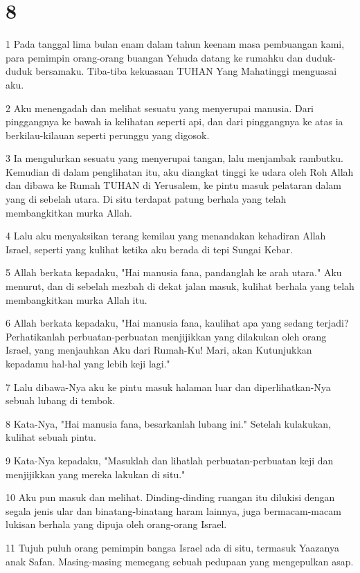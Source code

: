 \chapter{8}

\par 1 Pada tanggal lima bulan enam dalam tahun keenam masa pembuangan kami, para pemimpin orang-orang buangan Yehuda datang ke rumahku dan duduk-duduk bersamaku. Tiba-tiba kekuasaan TUHAN Yang Mahatinggi menguasai aku.
\par 2 Aku menengadah dan melihat sesuatu yang menyerupai manusia. Dari pinggangnya ke bawah ia kelihatan seperti api, dan dari pinggangnya ke atas ia berkilau-kilauan seperti perunggu yang digosok.
\par 3 Ia mengulurkan sesuatu yang menyerupai tangan, lalu menjambak rambutku. Kemudian di dalam penglihatan itu, aku diangkat tinggi ke udara oleh Roh Allah dan dibawa ke Rumah TUHAN di Yerusalem, ke pintu masuk pelataran dalam yang di sebelah utara. Di situ terdapat patung berhala yang telah membangkitkan murka Allah.
\par 4 Lalu aku menyaksikan terang kemilau yang menandakan kehadiran Allah Israel, seperti yang kulihat ketika aku berada di tepi Sungai Kebar.
\par 5 Allah berkata kepadaku, "Hai manusia fana, pandanglah ke arah utara." Aku menurut, dan di sebelah mezbah di dekat jalan masuk, kulihat berhala yang telah membangkitkan murka Allah itu.
\par 6 Allah berkata kepadaku, "Hai manusia fana, kaulihat apa yang sedang terjadi? Perhatikanlah perbuatan-perbuatan menjijikkan yang dilakukan oleh orang Israel, yang menjauhkan Aku dari Rumah-Ku! Mari, akan Kutunjukkan kepadamu hal-hal yang lebih keji lagi."
\par 7 Lalu dibawa-Nya aku ke pintu masuk halaman luar dan diperlihatkan-Nya sebuah lubang di tembok.
\par 8 Kata-Nya, "Hai manusia fana, besarkanlah lubang ini." Setelah kulakukan, kulihat sebuah pintu.
\par 9 Kata-Nya kepadaku, "Masuklah dan lihatlah perbuatan-perbuatan keji dan menjijikkan yang mereka lakukan di situ."
\par 10 Aku pun masuk dan melihat. Dinding-dinding ruangan itu dilukisi dengan segala jenis ular dan binatang-binatang haram lainnya, juga bermacam-macam lukisan berhala yang dipuja oleh orang-orang Israel.
\par 11 Tujuh puluh orang pemimpin bangsa Israel ada di situ, termasuk Yaazanya anak Safan. Masing-masing memegang sebuah pedupaan yang mengepulkan asap.
